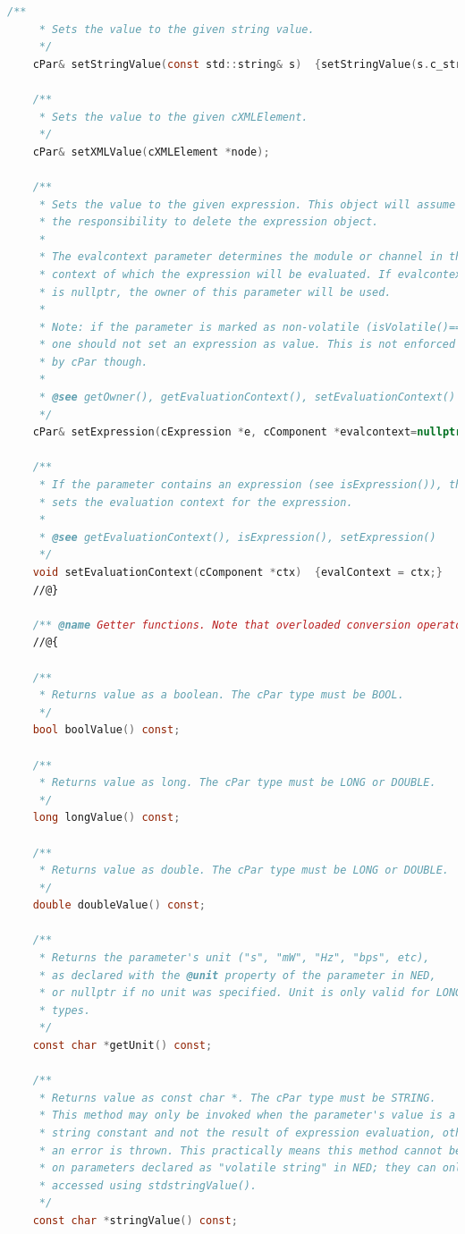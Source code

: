 \begin{lstlisting}[language=c]
    /**
     * Sets the value to the given string value.
     */
    cPar& setStringValue(const std::string& s)  {setStringValue(s.c_str()); return *this;}

    /**
     * Sets the value to the given cXMLElement.
     */
    cPar& setXMLValue(cXMLElement *node);

    /**
     * Sets the value to the given expression. This object will assume
     * the responsibility to delete the expression object.
     *
     * The evalcontext parameter determines the module or channel in the
     * context of which the expression will be evaluated. If evalcontext
     * is nullptr, the owner of this parameter will be used.
     *
     * Note: if the parameter is marked as non-volatile (isVolatile()==false),
     * one should not set an expression as value. This is not enforced
     * by cPar though.
     *
     * @see getOwner(), getEvaluationContext(), setEvaluationContext()
     */
    cPar& setExpression(cExpression *e, cComponent *evalcontext=nullptr);

    /**
     * If the parameter contains an expression (see isExpression()), this method
     * sets the evaluation context for the expression.
     *
     * @see getEvaluationContext(), isExpression(), setExpression()
     */
    void setEvaluationContext(cComponent *ctx)  {evalContext = ctx;}
    //@}

    /** @name Getter functions. Note that overloaded conversion operators also exist. */
    //@{

    /**
     * Returns value as a boolean. The cPar type must be BOOL.
     */
    bool boolValue() const;

    /**
     * Returns value as long. The cPar type must be LONG or DOUBLE.
     */
    long longValue() const;

    /**
     * Returns value as double. The cPar type must be LONG or DOUBLE.
     */
    double doubleValue() const;

    /**
     * Returns the parameter's unit ("s", "mW", "Hz", "bps", etc),
     * as declared with the @unit property of the parameter in NED,
     * or nullptr if no unit was specified. Unit is only valid for LONG and DOUBLE
     * types.
     */
    const char *getUnit() const;

    /**
     * Returns value as const char *. The cPar type must be STRING.
     * This method may only be invoked when the parameter's value is a
     * string constant and not the result of expression evaluation, otherwise
     * an error is thrown. This practically means this method cannot be used
     * on parameters declared as "volatile string" in NED; they can only be
     * accessed using stdstringValue().
     */
    const char *stringValue() const;


\end{lstlisting}
